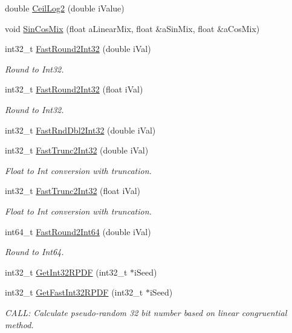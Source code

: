 \begin{DoxyCompactItemize}
\item 
double \hyperlink{a00288_aad5df8c4502619ca12136a2f7b8d8a06}{Ceil\+Log2} (double i\+Value)
\item 
void \hyperlink{a00288_a3826233eb62186c03bb093f1031ca8f4}{Sin\+Cos\+Mix} (float a\+Linear\+Mix, float \&a\+Sin\+Mix, float \&a\+Cos\+Mix)
\item 
int32\+\_\+t \hyperlink{a00288_af0bbeabd87aa74be4ecca4f767aedc41}{Fast\+Round2\+Int32} (double i\+Val)
\begin{DoxyCompactList}\small\item\em Round to Int32. \end{DoxyCompactList}\item 
int32\+\_\+t \hyperlink{a00288_a56cd923aeae2bd544f1fb43fff6b0b3d}{Fast\+Round2\+Int32} (float i\+Val)
\begin{DoxyCompactList}\small\item\em Round to Int32. \end{DoxyCompactList}\item 
int32\+\_\+t \hyperlink{a00288_ae690c060a5ff4cb96e77335231a29673}{Fast\+Rnd\+Dbl2\+Int32} (double i\+Val)
\item 
int32\+\_\+t \hyperlink{a00288_ad2b2872b49146cf0859c403fea702a39}{Fast\+Trunc2\+Int32} (double i\+Val)
\begin{DoxyCompactList}\small\item\em Float to Int conversion with truncation. \end{DoxyCompactList}\item 
int32\+\_\+t \hyperlink{a00288_a9a8bc8a47f13b4cb1bb84e45bf43fe82}{Fast\+Trunc2\+Int32} (float i\+Val)
\begin{DoxyCompactList}\small\item\em Float to Int conversion with truncation. \end{DoxyCompactList}\item 
int64\+\_\+t \hyperlink{a00288_a7df6b095ea2469f2adce2a895038212e}{Fast\+Round2\+Int64} (double i\+Val)
\begin{DoxyCompactList}\small\item\em Round to Int64. \end{DoxyCompactList}\item 
int32\+\_\+t \hyperlink{a00288_af3435129d3c94c5f3d5e671943b9bbe2}{Get\+Int32\+R\+P\+D\+F} (int32\+\_\+t $\ast$i\+Seed)
\item 
int32\+\_\+t \hyperlink{a00288_ad12251899137d551b9f652b1ffee2f99}{Get\+Fast\+Int32\+R\+P\+D\+F} (int32\+\_\+t $\ast$i\+Seed)
\begin{DoxyCompactList}\small\item\em C\+A\+L\+L\+: Calculate pseudo-\/random 32 bit number based on linear congruential method. \end{DoxyCompactList}\item 

\end{DoxyCompactItemize}
